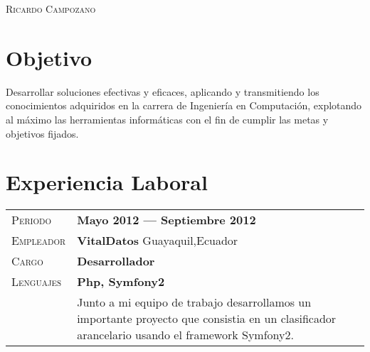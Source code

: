 \documentclass[a4paper, oneside, final]{scrartcl} %
\newcommand{\gray}{\rowcolor[gray]{.90}} %
\begin{document}
\begin{center} %


{\fontsize{36}{36}\selectfont\scshape Ricardo Campozano} %

\vspace{0.5 cm} %


\section{Objetivo}

Desarrollar soluciones efectivas y eficaces,  aplicando y transmitiendo los conocimientos adquiridos en la carrera de Ingeniería en Computación, explotando al máximo las herramientas informáticas con el fin de cumplir las metas y objetivos fijados.



\section{Experiencia Laboral}

\begin{tabularx}{0.97\linewidth}{>{\raggedleft\scshape}p{2.3cm}X}
\gray Periodo & \textbf{Mayo 2012 --- Septiembre 2012}\\
\gray Empleador & \textbf{VitalDatos} \hfill Guayaquil,Ecuador\\
\gray Cargo & \textbf{Desarrollador}\\
\gray Lenguajes & \textbf{Php, Symfony2}\\
&Junto a mi equipo de trabajo desarrollamos un importante proyecto que consistia en un clasificador arancelario usando el framework Symfony2.
\end{tabularx}

\vspace{12pt}


\end{center}
\end{document}
